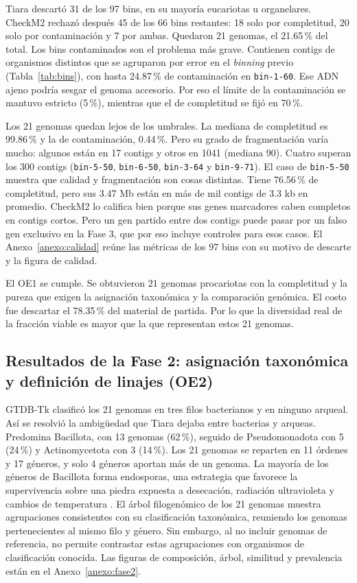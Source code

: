 Tiara descartó 31 de los 97 bins, en su mayoría eucariotas u organelares. CheckM2 
rechazó después 45 de los 66 bins restantes: 18 solo por completitud, 20 
solo por contaminación y 7 por ambas. Quedaron 21 genomas, el 21.65\,\% del 
total. Los bins contaminados son el problema más grave. Contienen contigs de
organismos distintos que se agruparon por error en el \textit{binning} previo
(Tabla~\ref{tab:bins}), con hasta 24.87\,\% de contaminación en
\texttt{bin-1-60}. Ese ADN ajeno podría sesgar el genoma accesorio. Por eso el
límite de la contaminación se mantuvo estricto (5\,\%), mientras que el de
completitud se fijó en 70\,\%.

Los 21 genomas quedan lejos de los umbrales. La mediana de completitud es
99.86\,\% y la de contaminación, 0.44\,\%. Pero su grado de fragmentación varía
mucho: algunos están en 17 contigs y otros en 1041 (mediana 90). Cuatro superan
los 300 contigs (\texttt{bin-5-50}, \texttt{bin-6-50}, \texttt{bin-3-64} y
\texttt{bin-9-71}).
El caso de \texttt{bin-5-50} muestra que calidad y fragmentación son cosas
distintas. Tiene 76.56\,\% de completitud, pero sus 3.47 Mb están en más de mil
contigs de 3.3 kb en promedio. CheckM2 lo califica bien porque sus genes
marcadores caben completos en contigs cortos. Pero un gen partido entre dos
contigs puede pasar por un falso gen exclusivo en la Fase 3, que por eso incluye
controles para esos casos. El Anexo~\ref{anexo:calidad} reúne las métricas de
los 97 bins con su motivo de descarte y la figura de calidad.

El OE1 se cumple. Se obtuvieron 21 genomas procariotas con la completitud y la
pureza que exigen la asignación taxonómica y la comparación genómica. El costo
fue descartar el 78.35\,\% del material de partida. Por lo que la diversidad
real de la fracción viable es mayor que la que representan estos 21 genomas.

\subsection{Resultados de la Fase 2: asignación taxonómica y definición de linajes (OE2)}
\label{subsec:res_fase2}

GTDB-Tk clasificó los 21 genomas en tres filos bacterianos y en ninguno arqueal.
Así se resolvió la ambigüedad que Tiara dejaba entre bacterias y arqueas.
Predomina Bacillota, con 13 genomas (62\,\%), seguido de Pseudomonadota con 5
(24\,\%) y Actinomycetota con 3 (14\,\%). Los 21 genomas se reparten en 11
órdenes y 17 géneros, y solo 4 géneros aportan más de un genoma. La mayoría
de los géneros de Bacillota forma endosporas, una estrategia que favorece la
supervivencia sobre una piedra expuesta a desecación, radiación ultravioleta y
cambios de temperatura \cite{jroundi2020}. El árbol filogenómico de los 21
genomas muestra agrupaciones consistentes con su clasificación taxonómica,
reuniendo los genomas pertenecientes al mismo filo y género. Sin embargo, al
no incluir genomas de referencia, no permite contrastar estas agrupaciones con
organismos de clasificación conocida. Las figuras de composición, árbol,
similitud y prevalencia están en el Anexo~\ref{anexo:fase2}.

